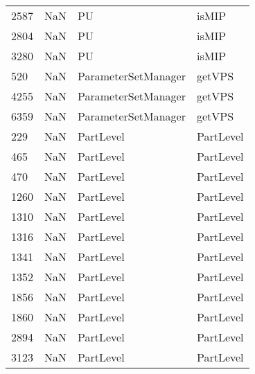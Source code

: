 \begin{tabular}{llll}
2587 &                   NaN &                         PU &                                     isMIP \\
2804 &                   NaN &                         PU &                                     isMIP \\
3280 &                   NaN &                         PU &                                     isMIP \\
520  &                   NaN &        ParameterSetManager &                                    getVPS \\
4255 &                   NaN &        ParameterSetManager &                                    getVPS \\
6359 &                   NaN &        ParameterSetManager &                                    getVPS \\
229  &                   NaN &                  PartLevel &                                 PartLevel \\
465  &                   NaN &                  PartLevel &                                 PartLevel \\
470  &                   NaN &                  PartLevel &                                 PartLevel \\
1260 &                   NaN &                  PartLevel &                                 PartLevel \\
1310 &                   NaN &                  PartLevel &                                 PartLevel \\
1316 &                   NaN &                  PartLevel &                                 PartLevel \\
1341 &                   NaN &                  PartLevel &                                 PartLevel \\
1352 &                   NaN &                  PartLevel &                                 PartLevel \\
1856 &                   NaN &                  PartLevel &                                 PartLevel \\
1860 &                   NaN &                  PartLevel &                                 PartLevel \\
2894 &                   NaN &                  PartLevel &                                 PartLevel \\
3123 &                   NaN &                  PartLevel &                                 PartLevel \\

\end{tabular}
